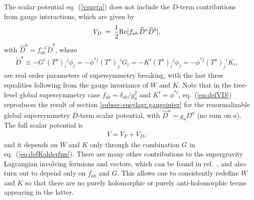 \documentclass[12pt]{article}
\def\beq{\begin{eqnarray}}
\def\eeq{\end{eqnarray}}
\begin{document}
The scalar potential eq.~(\ref{vsugra}) does not include the $D$-term 
contributions from gauge interactions, which are given by
\beq
V_D \>=\> {1\over 2}{\rm Re}[f_{ab}\, {\widehat D}^a {\widehat 
D}^b],
\label{eq:defVD}
\eeq
with $\widehat D^a = f_{ab}^{-1} \widetilde D^b$, where 
\beq
{\widetilde D}^a \equiv 
-G^i (T^a)_i{}^j \phi_j = -\phi^{*j} (T^a)_j{}^i G_i =
-K^i (T^a)_i{}^j \phi_j = -\phi^{*j} (T^a)_j{}^i K_i, 
\eeq
are real order parameters of supersymmetry breaking, with the last three 
equalities following from the gauge invariance of $W$ and $K$. 
Note that in the tree-level global supersymmetry case $f_{ab} = 
\delta_{ab}/g_a^2$ and $K^i = \phi^{*i}$, eq.~(\ref{eq:defVD}) reproduces 
the result of section \ref{subsec:susylagr.gaugeinter} for the 
renormalizable global supersymmetry $D$-term scalar potential, with 
$\widehat{D}^a = g_a D^a$ (no sum on $a$).
The full scalar 
potential is
\beq
V = V_F + V_D,
\eeq
and it depends on $W$ and $K$ only through the combination $G$ in 
eq.~(\ref{eq:defKahlerfun}). There are many other contributions to the 
supergravity Lagrangian involving fermions and vectors, which 
can be found in 
ref.~\cite{supergravity,superconformalsupergravity}, and
also turn 
out to depend 
only on $f_{ab}$ and 
$G$. This allows one 
to consistently 
redefine $W$ and $K$ so that there are no purely holomorphic or purely 
anti-holomorphic terms appearing in the latter.
\end{document}
